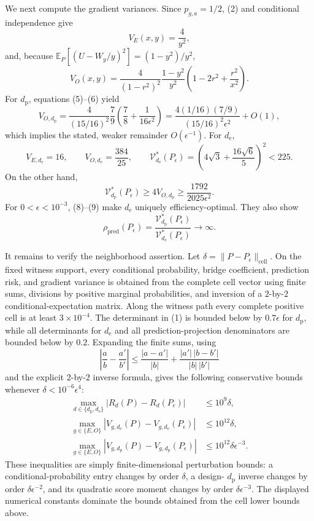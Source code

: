 We next compute the gradient variances.  Since \(p_{g,a}=1/2\), (2) and conditional independence give
\[
 V_E(x,y)=\frac4{y^2}, \tag{5}
\]
and, because \(\mathbb E_P[(U-W_y/y)^2]=(1-y^2)/y^2\),
\[
 V_O(x,y)=\frac4{(1-r^2)^2}\frac{1-y^2}{y^2}
 \left(1-2r^2+\frac{r^2}{x^2}\right). \tag{6}
\]
For \(d_{\mathrm p}\), equations (5)--(6) yield
\[
 V_{O,d_{\mathrm p}}
 =\frac4{(15/16)^2}\frac79
 \left(\frac78+\frac1{16\epsilon^2}\right)
 =\frac{4(1/16)(7/9)}{(15/16)^2\epsilon^2}+O(1), \tag{7}
\]
which implies the stated, weaker remainder \(O(\epsilon^{-1})\).  For \(d_{\mathrm e}\),
\[
 V_{E,d_{\mathrm e}}=16,\qquad
 V_{O,d_{\mathrm e}}=\frac{384}{25},\qquad
 \mathcal V_{d_{\mathrm e}}^*(P_{\epsilon})
 =\left(4\sqrt3+\frac{16\sqrt6}{5}\right)^2<225. \tag{8}
\]
On the other hand,
\[
 \mathcal V_{d_{\mathrm p}}^*(P_{\epsilon})
 \ge4V_{O,d_{\mathrm p}}
 \ge\frac{1792}{2025\epsilon^2}. \tag{9}
\]
For \(0<\epsilon<10^{-3}\), (8)--(9) make \(d_{\mathrm e}\) uniquely efficiency-optimal.  They also show
\[
 \rho_{\mathrm{pred}}(P_{\epsilon})
 =\frac{\mathcal V_{d_{\mathrm p}}^*(P_{\epsilon})}
 {\mathcal V_{d_{\mathrm e}}^*(P_{\epsilon})}
 \longrightarrow\infty. \tag{10}
\]

It remains to verify the neighborhood assertion.  Let
\(\delta=\|P-P_{\epsilon}\|_{\mathrm{cell}}\).  On the fixed witness support, every conditional probability, bridge coefficient, prediction risk, and gradient variance is obtained from the complete cell vector using finite sums, divisions by positive marginal probabilities, and inversion of a \(2\)-by-\(2\) conditional-expectation matrix.  Along the witness path every complete positive cell is at least \(3\times10^{-4}\).  The determinant in (1) is bounded below by \(0.7\epsilon\) for \(d_{\mathrm p}\), while all determinants for \(d_{\mathrm e}\) and all prediction-projection denominators are bounded below by \(0.2\).  Expanding the finite sums, using
\[
 \left|\frac ab-\frac{a'}{b'}\right|
 \le \frac{|a-a'|}{|b|}+\frac{|a'|\,|b-b'|}{|b|\,|b'|}
\]
and the explicit \(2\)-by-\(2\) inverse formula, gives the following conservative bounds whenever \(\delta<10^{-6}\epsilon^4\):
\[
\begin{aligned}
 \max_{d\in\{d_{\mathrm p},d_{\mathrm e}\}}
 |R_d(P)-R_d(P_{\epsilon})|&\le10^9\delta,\\
 \max_{g\in\{E,O\}}|V_{g,d_{\mathrm e}}(P)-V_{g,d_{\mathrm e}}(P_{\epsilon})|
 &\le10^{12}\delta,\\
 \max_{g\in\{E,O\}}|V_{g,d_{\mathrm p}}(P)-V_{g,d_{\mathrm p}}(P_{\epsilon})|
 &\le10^{12}\delta\epsilon^{-3}.
\end{aligned} \tag{11}
\]
These inequalities are simply finite-dimensional perturbation bounds: a conditional-probability entry changes by order \(\delta\), a design-
\(d_{\mathrm p}\) inverse changes by order \(\delta\epsilon^{-2}\), and its quadratic score moment changes by order \(\delta\epsilon^{-3}\).  The displayed numerical constants dominate the bounds obtained from the cell lower bounds above.

